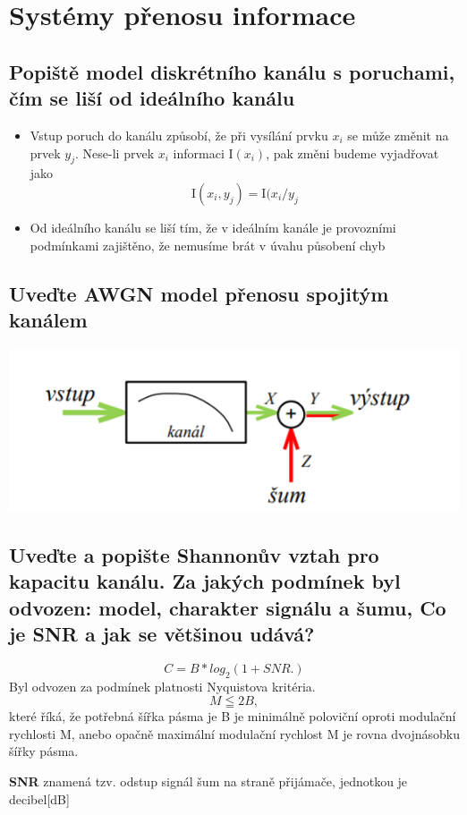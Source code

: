 \clearpage
\section{Systémy přenosu informace}
\subsection{Popiště model diskrétního kanálu s poruchami, čím se liší od ideálního kanálu}
\begin{itemize}
    \item Vstup poruch do kanálu způsobí, že při vysílání prvku $x_i$ se může změnit na prvek $y_j$.
    Nese-li prvek $x_i$ informaci I$(x_i)$, pak změni budeme vyjadřovat jako
    $$\mathrm{I}(x_i, y_j) = \mathrm{I}(x_i / y_j$$
    \item Od ideálního kanálu se liší tím, že v ideálním kanále je provozními podmínkami zajištěno, že nemusíme brát v úvahu působení chyb
\end{itemize}

\subsection{Uveďte AWGN model přenosu spojitým kanálem}
\includegraphics[]{images/AWGN.png}

\subsection{Uveďte a popište Shannonův vztah pro kapacitu kanálu. Za jakých podmínek byl odvozen: model, charakter signálu a šumu, Co je SNR a jak se většinou udává?}
$$C = B*log_2(1+SNR.)$$
Byl odvozen za podmínek platnosti Nyquistova kritéria.
$$M \leqq 2B,$$ které říká, že potřebná šířka pásma je B je minimálně poloviční oproti modulační rychlosti M, anebo opačně maximální modulační rychlost M je rovna dvojnásobku šířky pásma.

\textbf{SNR} znamená tzv. odstup signál šum na straně přijámače, jednotkou je decibel[dB]

